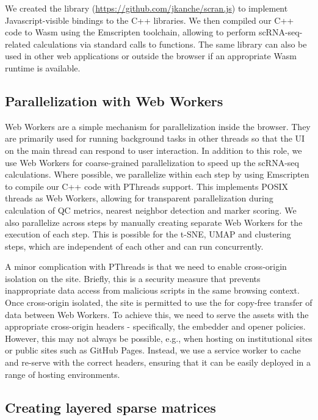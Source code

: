 \documentclass{article}
\begin{document}
We created the  library (\url{https://github.com/jkanche/scran.js}) to implement Javascript-visible bindings to the C++ libraries.
We then compiled our C++ code to Wasm using the Emscripten toolchain, allowing  to perform scRNA-seq-related calculations via standard calls to  functions.
The same library can also be used in other web applications or outside the browser if an appropriate Wasm runtime is available.


\subsection{Parallelization with Web Workers}

Web Workers are a simple mechanism for parallelization inside the browser.
They are primarily used for running background tasks in other threads so that the UI on the main thread can respond to user interaction.
In addition to this role, we use Web Workers for coarse-grained parallelization to speed up the scRNA-seq calculations.
Where possible, we parallelize within each step by using Emscripten to compile our C++ code with PThreads support.
This implements POSIX threads as Web Workers, allowing for transparent parallelization during calculation of QC metrics, nearest neighbor detection and marker scoring.
We also parallelize across steps by manually creating separate Web Workers for the execution of each step.
This is possible for the t-SNE, UMAP and clustering steps, which are independent of each other and can run concurrently.

A minor complication with PThreads is that we need to enable cross-origin isolation on the  site.
Briefly, this is a security measure that prevents inappropriate data access from malicious scripts in the same browsing context.
Once cross-origin isolated, the site is permitted to use the  for copy-free transfer of data between Web Workers.
To achieve this, we need to serve the  assets with the appropriate cross-origin headers - specifically, the embedder and opener policies.
However, this may not always be possible, e.g., when hosting on institutional sites or public sites such as GitHub Pages.
Instead, we use a service worker to cache and re-serve  with the correct headers,
ensuring that it can be easily deployed in a range of hosting environments.

\subsection{Creating layered sparse matrices}
\end{document}
